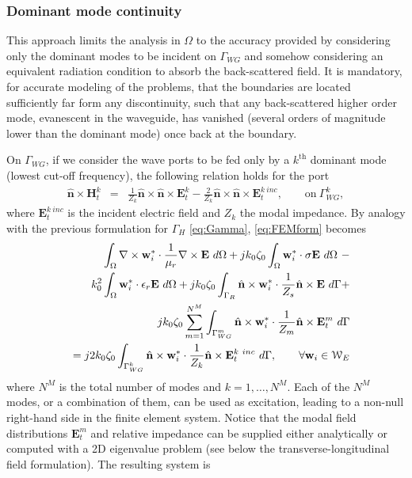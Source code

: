 \subsubsection*{Dominant mode continuity}

This approach limits the analysis in $\Omega$ to the accuracy provided by considering only the dominant modes to be incident on $\Gamma_{WG}$ and somehow considering an equivalent radiation condition to absorb the back-scattered field. It is mandatory, for accurate modeling of the problems, that the boundaries are located sufficiently far form any discontinuity, such that any back-scattered higher order mode, evanescent in the waveguide, has vanished (several orders of magnitude lower than the dominant mode) once back at the boundary.

On $\Gamma_{WG}$, if we consider the wave ports to be fed only by a $k^\mathrm{th}$ dominant mode (lowest cut-off frequency), the following relation holds for the port \cite{pelosi2009quick, zhu2006multigrid}
\begin{eqnarray}
\label{eq:WGcond}
\hat{\mathbf{n}} \times \mathbf{H}_t^k & = & \frac{1}{Z_k} \hat{\mathbf{n}} \times \hat{\mathbf{n}} \times \mathbf{E}_t^k - \frac{2}{Z_k} \hat{\mathbf{n}} \times \hat{\mathbf{n}} \times \mathbf{E}_t^{k \ inc}, \qquad \mathrm{on} \ \Gamma_{WG}^k,
\end{eqnarray} where $\mathbf{E}_t^{k \ inc}$ is the incident electric field and ${Z_k}$ the modal impedance. By analogy with the previous formulation for $\Gamma_H$ \eqref{eq:Gamma}, \eqref{eq:FEMform} becomes 
\begin{eqnarray}
\label{eq:FEMformRadPorts}
& & \hspace{-1.5cm} \int_\Omega \nabla \times \mathbf{w}_i^* \cdot \frac{1}{\mu_r} \nabla \times \mathbf{E} \ d\Omega + j k_0 \zeta_0 \int_\Omega \mathbf{w}_i^* \cdot \sigma \mathbf{E} \  d\Omega \ - \nonumber \\
& &\hspace{-1cm} k_0^2 \int_\Omega \mathbf{w}_i^* \cdot \epsilon_r \mathbf{E} \ d\Omega + j k_0 \zeta_0 \int_{\Gamma_R} \hat{\mathbf{n}} \times \mathbf{w}_i^* \cdot \frac{1}{Z_s} \hat{\mathbf{n}} \times \mathbf{E}\  d\Gamma + \nonumber \\
& & \hspace{-.5cm} j k_0 \zeta_0 \sum_{m=1}^{N^M} \int_{\Gamma_{WG}^m} \hat{\mathbf{n}} \times \mathbf{w}_i^* \cdot \frac{1}{Z_m} \hat{\mathbf{n}} \times \mathbf{E}_t^m \ d\Gamma \nonumber \\
& & \hspace{0cm} = j 2 k_0 \zeta_0 \int_{\Gamma_{WG}^k} \hat{\mathbf{n}} \times \mathbf{w}_i^* \cdot \frac{1}{Z_k} \hat{\mathbf{n}} \times \mathbf{E}_t^{k \ inc} \  d\Gamma, \qquad \forall \mathbf{w}_i \in \mathcal{W}_E
\end{eqnarray} where $N^M$ is the total number of modes and $k = 1, \ldots,  N^M$. Each of the $N^M$ modes, or a combination of them, can be used as excitation, leading to a non-null right-hand side in the finite element system. Notice that the modal field distributions $\mathbf{E}_t^m$ and relative impedance can be supplied either analytically or computed with a 2D eigenvalue problem (see below the transverse-longitudinal field formulation). The resulting system is
